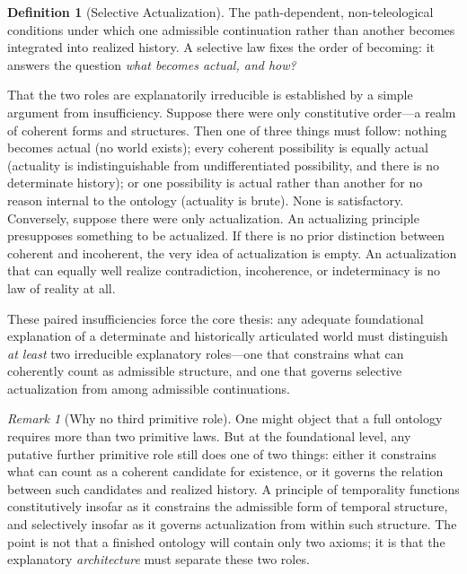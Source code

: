 \documentclass[11pt,a4paper]{article}
\theoremstyle{plain}
\theoremstyle{definition}
\newtheorem{definition}[theorem]{Definition}
\theoremstyle{remark}
\newtheorem{remark}[theorem]{Remark}
\begin{document}
\begin{definition}[Selective Actualization]
\label{def:selective}
The path-dependent, non-teleological conditions under which one admissible continuation rather than another becomes integrated into realized history.  A selective law fixes the order of becoming: it answers the question \emph{what becomes actual, and how?}
\end{definition}

That the two roles are explanatorily irreducible is established by a simple argument from insufficiency.  Suppose there were only constitutive order---a realm of coherent forms and structures.  Then one of three things must follow: nothing becomes actual (no world exists); every coherent possibility is equally actual (actuality is indistinguishable from undifferentiated possibility, and there is no determinate history); or one possibility is actual rather than another for no reason internal to the ontology (actuality is brute).  None is satisfactory.  Conversely, suppose there were only actualization.  An actualizing principle presupposes something to be actualized.  If there is no prior distinction between coherent and incoherent, the very idea of actualization is empty.  An actualization that can equally well realize contradiction, incoherence, or indeterminacy is no law of reality at all.

These paired insufficiencies force the core thesis: any adequate foundational explanation of a determinate and historically articulated world must distinguish \emph{at least} two irreducible explanatory roles---one that constrains what can coherently count as admissible structure, and one that governs selective actualization from among admissible continuations.

\begin{remark}[Why no third primitive role]
One might object that a full ontology requires more than two primitive laws.  But at the foundational level, any putative further primitive role still does one of two things: either it constrains what can count as a coherent candidate for existence, or it governs the relation between such candidates and realized history.  A principle of temporality functions constitutively insofar as it constrains the admissible form of temporal structure, and selectively insofar as it governs actualization from within such structure.  The point is not that a finished ontology will contain only two axioms; it is that the explanatory \emph{architecture} must separate these two roles.
\end{remark}
\end{document}
